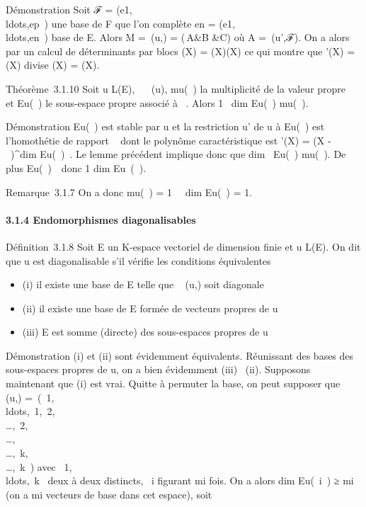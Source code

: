 Démonstration Soit ℱ =
(e1,\\ldots,ep~)
une base de F que l'on complète en  =
(e1,\\ldots,en~)
base de E. Alors M =\
\mathrmMat (u,) = \left
(\matrix\,A&B
&C\right ) où A =\
\mathrmMat (u',ℱ). On a alors par un calcul de
déterminants par blocs \chiM(X) = \chiA(X)\chiC(X)
ce qui montre que \chiu'(X) = \chiA(X) divise
\chiu(X) = \chiM(X).

Théorème~3.1.10 Soit u \in L(E), \lambda~
\in{}~(u),
mu(\lambda~) la multiplicité de la valeur propre \lambda~ et Eu(\lambda~)
le sous-espace propre associé à \lambda~. Alors 1 \leq\
dim Eu(\lambda~) \leq mu(\lambda~).

Démonstration Eu(\lambda~) est stable par u et la restriction u' de u
à Eu(\lambda~) est l'homothétie de rapport \lambda~ dont le polynôme
caractéristique est \chiu'(X) = (X -
\lambda~)^dim Eu(\lambda~)~. Le lemme
précédent implique donc que dim~
Eu(\lambda~) \leq mu(\lambda~). De plus
Eu(\lambda~)\neq~\0\,
donc 1 \leq dim Eu~(\lambda~).

Remarque~3.1.7 On a donc mu(\lambda~) = 1 \rigtharrow~\
dim Eu(\lambda~) = 1.

\paragraph{3.1.4 Endomorphismes diagonalisables}

Définition~3.1.8 Soit E un K-espace vectoriel de dimension finie et u \in
L(E). On dit que u est diagonalisable s'il vérifie les conditions
équivalentes

\begin{itemize}
\itemsep1pt\parskip0pt\parsep0pt
\item
  (i) il existe une base  de E telle que
  \mathrmMat~ (u,) soit
  diagonale
\item
  (ii) il existe une base \mathcal{E} de E formée de vecteurs propres de u
\item
  (iii) E est somme (directe) des sous-espaces propres de u
\end{itemize}

Démonstration (i) et (ii) sont évidemment équivalents. Réunissant des
bases des sous-espaces propres de u, on a bien évidemment (iii) \rigtharrow~(ii).
Supposons maintenant que (i) est vrai. Quitte à permuter la base, on
peut supposer que
\mathrmMat~ (u,\mathcal{E})
=\
\mathrmdiag(\lambda~1,\\ldots,\lambda~1,\lambda~2,\\\ldots,\lambda~2,\\\ldots,\\\ldots,\lambda~k,\\\ldots,\lambda~k~)
avec
\lambda~1,\\ldots,\lambda~k~
deux à deux distincts, \lambda~i figurant mi fois. On a
alors dim Eu(\lambda~i~) ≥
mi (on a mi vecteurs de base dans cet espace), soit

